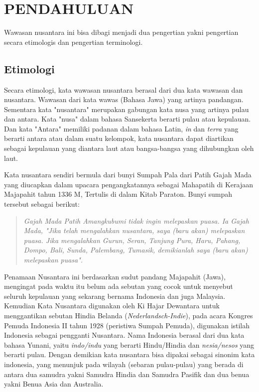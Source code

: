 \documentclass[12pt, a4paper]{article}
\begin{document}
\section{PENDAHULUAN}
\setlength{\parindent}{1em}
\justifying
Wawasan nusantara ini bisa dibagi menjadi dua pengertian yakni pengertian secara etimologis dan pengertian terminologi.

\subsection*{Etimologi}
Secara etimologi, kata wawasan nusantara berasal dari dua kata wawasan dan nusantara. Wawasan dari kata wawas (Bahasa Jawa) yang artinya pandangan. Sementara kata "nusantara" merupakan gabungan kata nusa yang artinya pulau dan antara. Kata "nusa" dalam bahasa Sansekerta berarti pulau atau kepulauan. Dan kata "Antara" memiliki padanan dalam bahasa Latin, \textit{in} dan \textit{terra} yang berarti antara atau dalam suatu kelompok, kata nusantara dapat diartikan sebagai kepulauan yang diantara laut atau bangsa-bangsa yang dihubungkan oleh laut. 

Kata nusantara sendiri bermula dari bunyi Sumpah Pala dari Patih Gajah Mada yang diucapkan dalam upacara pengangkatannya sebagai Mahapatih di Kerajaan Majapahit tahun 1336 M, Tertulis di dalam Kitab Paraton. Bunyi sumpah tersebut sebagai berikut:

\begin{quote}
\itshape
Gajah Mada Patih Amangkubumi tidak ingin melepaskan puasa. Ia Gajah Mada, "Jika telah mengalahkan nusantara, saya (baru akan) melepaskan puasa. Jika mengalahkan Gurun, Seran, Tanjung Pura, Haru, Pahang, Dompo, Bali, Sunda, Palembang, Tumasik, demikianlah saya (baru akan) melepaskan puasa".
\end{quote}

Penamaan Nusantara ini berdasarkan sudut pandang Majapahit (Jawa), mengingat pada waktu itu belum ada sebutan yang cocok untuk menyebut seluruh kepulauan yang sekarang bernama Indonesia dan juga Malaysia. Kemudian Kata Nusantara digunakan oleh Ki Hajar Dewantara untuk menggantikan sebutan Hindia Belanda (\textit{Nederlandsch-Indie}), pada acara Kongres Pemuda Indonesia II tahun 1928 (peristiwa Sumpah Pemuda), digunakan istilah Indonesia sebagai pengganti Nusantara. Nama Indonesia berasal dari dua kata bahasa Yunani, yaitu \textit{indo/indu} yang berarti Hindu/Hindia dan \textit{nesia/nesos} yang berarti pulau. Dengan demikian kata nusantara bisa dipakai sebagai sinonim kata indonesia, yang menunjuk pada wilayah (sebaran pulau-pulau) yang berada di antara dua samudra yakni Samudra Hindia dan Samudra Pasifik dan dua benua yakni Benua Asia dan Australia.
\end{document}
